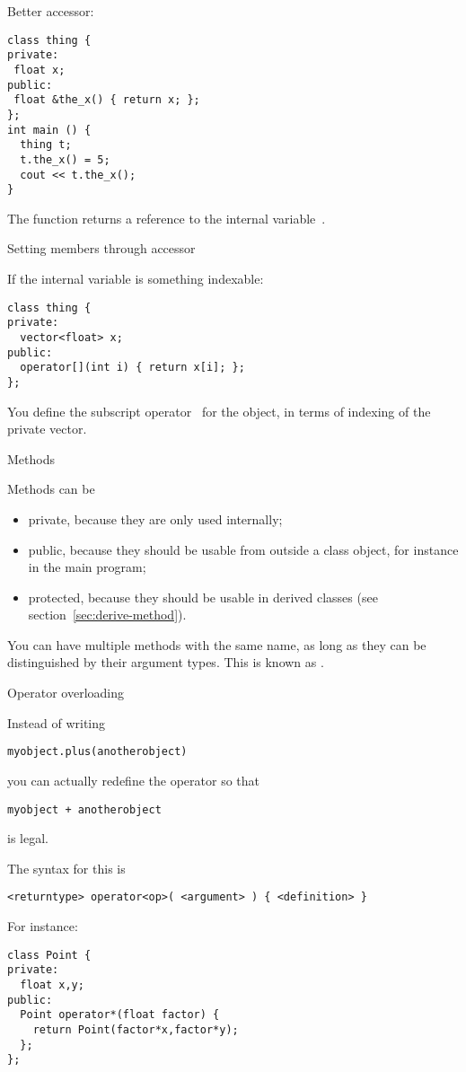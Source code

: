 Better accessor:
\begin{verbatim}
class thing {
private:
 float x;
public:
 float &the_x() { return x; };
};
int main () {
  thing t;
  t.the_x() = 5;
  cout << t.the_x();
}
\end{verbatim}
The function  returns a reference to the internal
variable~.

\begin{block}{Setting members through accessor}
  \label{sl:setmember}
\end{block}

If the internal variable is something indexable:
\begin{verbatim}
class thing {
private:
  vector<float> x;
public:
  operator[](int i) { return x[i]; };
};
\end{verbatim}
You define the subscript operator~\n{[]} for the object, in terms of
indexing of the private vector.

 {Methods}

Methods can be 
\begin{itemize}
\item private, because they are only used internally;
\item public, because they should be usable from outside a class
  object, for instance in the main program;
\item protected, because they should be usable in derived classes (see
  section~\ref{sec:derive-method}).
\end{itemize}

You can have multiple methods with the same name, as long as they can
be distinguished by their argument types. This is known as .

 {Operator overloading}
\label{sec:operatordef}

Instead of writing 
\begin{verbatim}
myobject.plus(anotherobject)
\end{verbatim}
you can actually redefine the \n{+} operator so that
\begin{verbatim}
myobject + anotherobject
\end{verbatim}
is legal.

The syntax for this is
\begin{verbatim}
<returntype> operator<op>( <argument> ) { <definition> }
\end{verbatim}
For instance:
\begin{verbatim}
class Point {
private:
  float x,y;
public:
  Point operator*(float factor) {
    return Point(factor*x,factor*y);
  };
};
\end{verbatim}

